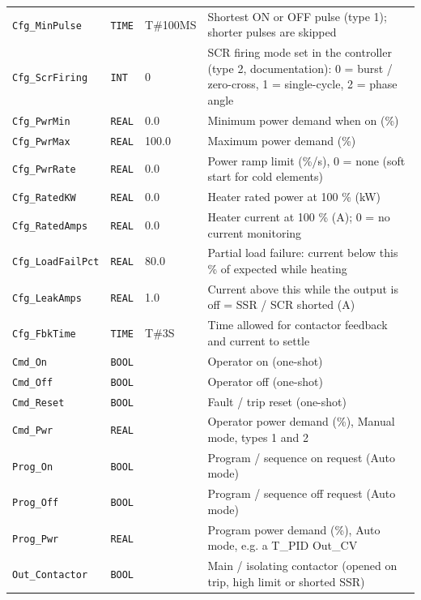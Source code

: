 \begin{small}
\begin{longtable}{@{}P{3.70cm}P{2.20cm}P{1.70cm}P{8.91cm}@{}}
\texttt{Cfg\_MinPulse} & \texttt{TIME} & T\#100MS & Shortest ON or OFF pulse (type 1); shorter pulses are skipped \\
\texttt{Cfg\_ScrFiring} & \texttt{INT} & 0 & SCR firing mode set in the controller (type 2, documentation): 0 = burst /\allowbreak{} zero-cross, 1 = single-cycle, 2 = phase angle \\
\texttt{Cfg\_PwrMin} & \texttt{REAL} & 0.0 & Minimum power demand when on (\%) \\
\texttt{Cfg\_PwrMax} & \texttt{REAL} & 100.0 & Maximum power demand (\%) \\
\texttt{Cfg\_PwrRate} & \texttt{REAL} & 0.0 & Power ramp limit (\%/\allowbreak{}s), 0 = none (soft start for cold elements) \\
\texttt{Cfg\_RatedKW} & \texttt{REAL} & 0.0 & Heater rated power at 100 \% (kW) \\
\texttt{Cfg\_RatedAmps} & \texttt{REAL} & 0.0 & Heater current at 100 \% (A); 0 = no current monitoring \\
\texttt{Cfg\_LoadFailPct} & \texttt{REAL} & 80.0 & Partial load failure: current below this \% of expected while heating \\
\texttt{Cfg\_LeakAmps} & \texttt{REAL} & 1.0 & Current above this while the output is off = SSR /\allowbreak{} SCR shorted (A) \\
\texttt{Cfg\_FbkTime} & \texttt{TIME} & T\#3S & Time allowed for contactor feedback and current to settle \\
\texttt{Cmd\_On} & \texttt{BOOL} &  & Operator on (one-shot) \\
\texttt{Cmd\_Off} & \texttt{BOOL} &  & Operator off (one-shot) \\
\texttt{Cmd\_Reset} & \texttt{BOOL} &  & Fault /\allowbreak{} trip reset (one-shot) \\
\texttt{Cmd\_Pwr} & \texttt{REAL} &  & Operator power demand (\%), Manual mode, types 1 and 2 \\
\texttt{Prog\_On} & \texttt{BOOL} &  & Program /\allowbreak{} sequence on request (Auto mode) \\
\texttt{Prog\_Off} & \texttt{BOOL} &  & Program /\allowbreak{} sequence off request (Auto mode) \\
\texttt{Prog\_Pwr} & \texttt{REAL} &  & Program power demand (\%), Auto mode, e.g. a T\_PID Out\_CV \\
\texttt{Out\_Contactor} & \texttt{BOOL} &  & Main /\allowbreak{} isolating contactor (opened on trip, high limit or shorted SSR) \\

\end{longtable}
\end{small}
